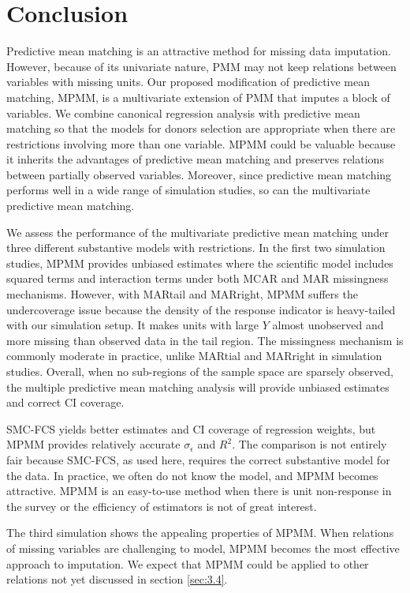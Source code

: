 	\section{Conclusion}
	\label{sec:3.5}
	Predictive mean matching is an attractive method for missing data imputation. However, because of its univariate nature, PMM may not keep relations between variables with missing units. Our proposed modification of predictive mean matching, MPMM, is a multivariate extension of PMM that imputes a block of variables. We combine canonical regression analysis with predictive mean matching so that the models for donors selection are appropriate when there are restrictions involving more than one variable. MPMM could be valuable because it inherits the advantages of predictive mean matching and preserves relations between partially observed variables. Moreover, since predictive mean matching performs well in a wide range of simulation studies, so can the multivariate predictive mean matching.     
	
	We assess the performance of the multivariate predictive mean matching under three different substantive models with restrictions. In the first two simulation studies, MPMM provides unbiased estimates where the scientific model includes squared terms and interaction terms under both MCAR and MAR missingness mechanisms. However, with MARtail and MARright, MPMM suffers the undercoverage issue because the density of the response indicator is heavy-tailed with our simulation setup. It makes units with large $Y$ almost unobserved and more missing than observed data in the tail region. The missingness mechanism is commonly moderate in practice, unlike MARtial and MARright in simulation studies. Overall, when no sub-regions of the sample space are sparsely observed, the multiple predictive mean matching analysis will provide unbiased estimates and correct CI coverage. 
	
	SMC-FCS yields better estimates and CI coverage of regression weights, but MPMM provides relatively accurate $\sigma_\epsilon$ and $R^2$. The comparison is not entirely fair because SMC-FCS, as used here, requires the correct substantive model for the data. In practice, we often do not know the model, and MPMM becomes attractive. MPMM is an easy-to-use method when there is unit non-response in the survey or the efficiency of estimators is not of great interest. 
	
	The third simulation shows the appealing properties of MPMM. When relations of missing variables are challenging to model, MPMM becomes the most effective approach to imputation. We expect that MPMM could be applied to other relations not yet discussed in section \ref{sec:3.4}.    
	
